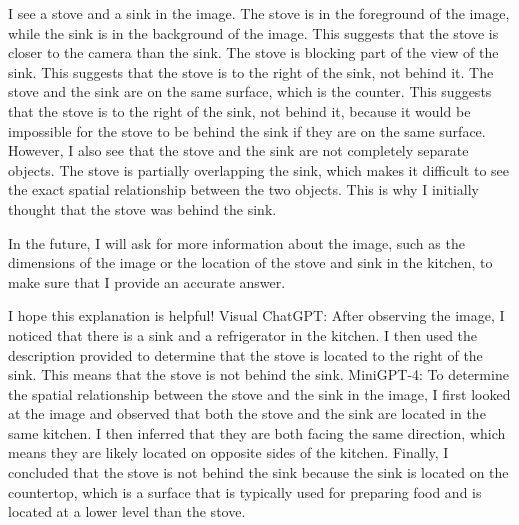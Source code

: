 \begin{enumerate}
    I see a stove and a sink in the image.
    The stove is in the foreground of the image, while the sink is in the background of the image. This suggests that the stove is closer to the camera than the sink.
    The stove is blocking part of the view of the sink. This suggests that the stove is to the right of the sink, not behind it.
    The stove and the sink are on the same surface, which is the counter. This suggests that the stove is to the right of the sink, not behind it, because it would be impossible for the stove to be behind the sink if they are on the same surface.
    However, I also see that the stove and the sink are not completely separate objects. The stove is partially overlapping the sink, which makes it difficult to see the exact spatial relationship between the two objects. This is why I initially thought that the stove was behind the sink.
    
    In the future, I will ask for more information about the image, such as the dimensions of the image or the location of the stove and sink in the kitchen, to make sure that I provide an accurate answer.
    
    I hope this explanation is helpful!
    \subitem Visual ChatGPT: After observing the image, I noticed that there is a sink and a refrigerator in the kitchen. I then used the description provided to determine that the stove is located to the right of the sink. This means that the stove is not behind the sink.
    \subitem MiniGPT-4: To determine the spatial relationship between the stove and the sink in the image, I first looked at the image and observed that both the stove and the sink are located in the same kitchen. I then inferred that they are both facing the same direction, which means they are likely located on opposite sides of the kitchen. Finally, I concluded that the stove is not behind the sink because the sink is located on the countertop, which is a surface that is typically used for preparing food and is located at a lower level than the stove.
\end{enumerate}
